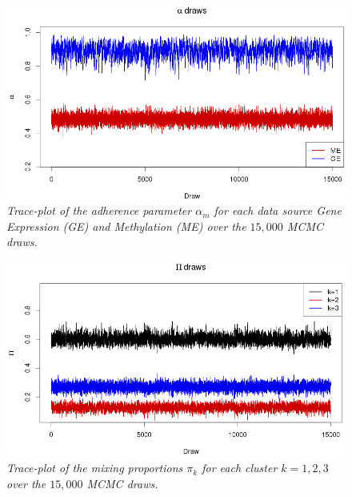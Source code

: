 \begin{figure}[!ht]
\begin{center}
 \includegraphics[scale = 0.63]{images/bccMV2DAlpha}
\caption{\emph{Trace-plot of the adherence parameter $\alpha_{m}$ for each data source Gene Expression (GE) and Methylation (ME) over the $15,000$ MCMC draws.}}
\label{mix-alpha-pic}
\end{center}
\end{figure}

\begin{figure}[!ht]
\begin{center}
 \includegraphics[scale = 0.63]{images/bccMV2DMixProp}
\caption{\emph{Trace-plot of the mixing proportions $\pi_{k}$ for each cluster $k=1,2,3$ over the $15,000$ MCMC draws.}}
\label{mix-pi-pic}
\end{center}
\end{figure}

